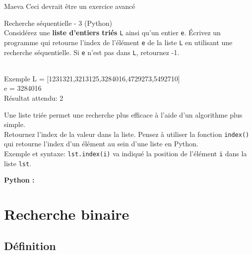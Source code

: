 \begin{note}{Maeva}
    Ceci devrait être un exercice avancé
\end{note}
\begin{Exercice}[5 minutes] Recherche séquentielle - 3 (Python)\\

    Considérez une \textbf{liste d’entiers triés} \lstinline{L} ainsi qu’un entier \lstinline{e}. Écrivez un programme qui retourne l'index de l'élément \lstinline{e} de la liste \lstinline{L} en utilisant une recherche séquentielle. Si \lstinline{e} n’est pas dans \lstinline{L}, retournez -1.\\\\
    
    \begin{Example}{\faTerminal Exemple}
    L = [1231321,3213125,3284016,4729273,5492710]\\
    e = 3284016\\
    Résultat attendu: 2\\
    \end{Example}
  


    \begin{conseil}
        Une liste triée permet une recherche plus efficace à l'aide d'un algorithme plus simple.\\
        Retournez l'index de la valeur dans la liste. Pensez à utiliser la fonction \lstinline{index()} qui retourne l'index d'un élément au sein d'une liste en Python.\\Exemple et syntaxe: \lstinline{lst.index(i)} va indiqué la position de l'élément \lstinline{i} dans la liste \lstinline{lst}.
    \end{conseil}


    \begin{solution}
        \textbf{Python :}
        
    \end{solution}
\end{Exercice}

\newpage
\section{Recherche binaire}

\subsection{Définition}

